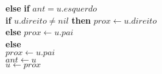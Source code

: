 \documentclass{beamer}
\begin{document}
\begin{frame}[shrink]
\begin{oframed}
\begin{flushleft}
\hspace*{1em} \hspace*{1em} \hspace*{1em} {\color{black} \textbf{else}} {\color{black} \textbf{if}} \ensuremath{\ensuremath{\mathit{ant}} = \ensuremath{\mathit{u}}.\ensuremath{\mathit{esquerdo}}}\\
\hspace*{1em} \hspace*{1em} \hspace*{1em} \hspace*{1em} {\color{black} \textbf{if}} \ensuremath{\ensuremath{\mathit{u}}.\ensuremath{\mathit{direito}} \ne nil} {\color{black} \textbf{then}}  \ensuremath{\ensuremath{\mathit{prox}} \gets  \ensuremath{\ensuremath{\mathit{u}}.direito}}\\
\hspace*{1em} \hspace*{1em} \hspace*{1em} \hspace*{1em} {\color{black} \textbf{else}}  \ensuremath{\ensuremath{\mathit{prox}} \gets  \ensuremath{\ensuremath{\mathit{u}}.pai}}\\
\hspace*{1em} \hspace*{1em} \hspace*{1em} {\color{black} \textbf{else}} \\
\hspace*{1em} \hspace*{1em} \hspace*{1em} \hspace*{1em} \ensuremath{\ensuremath{\mathit{prox}} \gets  \ensuremath{\ensuremath{\mathit{u}}.pai}}\\
\hspace*{1em} \hspace*{1em} \hspace*{1em} \ensuremath{\ensuremath{\mathit{ant}} \gets  \ensuremath{u}}\\
\hspace*{1em} \hspace*{1em} \hspace*{1em} \ensuremath{\ensuremath{\mathit{u}} \gets  \ensuremath{prox}}\\
\end{flushleft}
\end{oframed}
\end{frame}
\end{document}
